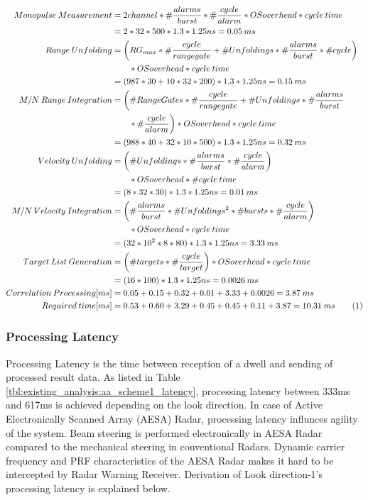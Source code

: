 \begin{align*}
	\label{aa:scheme1:core4:equ3}
		Monopulse \: Measurement &= 2channel * \#\frac{alarms}{burst} * \#\frac{cycle}{alarm} * OSoverhead * cycle \: time \\
		&= 2 * 32 * 500 * 1.3 * 1.25ns = 0.05 \: ms \\
		Range \: Unfolding &= \bigg(RG_{max} * \#\frac{cycle}{rangegate} + \# Unfoldings * \#\frac{alarms}{burst} * \#cycle\bigg) \\
		& \qquad *OSoverhead * cycle \: time \\
		&= (987 * 30 + 10 * 32 * 200) * 1.3 * 1.25ns = 0.15 \: ms \\
		M/N \: Range \: Integration &= \bigg(\#RangeGates * \#\frac{cycle}{rangegate} + \#Unfoldings * \#\frac{alarms}{burst} \\
		&\qquad * \#\frac{cycle}{alarm}\bigg) * OSoverhead *cycle \: time \\
		&= (988 * 40 + 32 * 10 * 500) * 1.3 * 1.25ns = 0.32 \: ms \\
		Velocity \: Unfolding &= \bigg(\#Unfoldings * \#\frac{alarms}{burst} * \#\frac{cycle}{alarm}\bigg) \\
		& \qquad * OSoverhead * \#cycle \: time \\
		&= (8 * 32 * 30) * 1.3 * 1.25ns = 0.01 \: ms \\
		M/N \: Velocity \: Integration &= \bigg(\#\frac{alarms}{burst} * \#Unfoldings^{2} * \#bursts * \#\frac{cycle}{alarm}\bigg) \\
		& \qquad * OSoverhead * cycle \: time \\
		&= (32 * 10^{2} * 8 * 80) * 1.3 * 1.25ns =  3.33 \: ms \\
		Target \: List \: Generation &= \bigg(\#targets * \#\frac{cycle}{target}\bigg) * OSoverhead * cycle \: time \\
		&= (16 * 100) * 1.3 * 1.25ns = 0.0026 \: ms \\
		Correlation \: Processing[ms] &= 0.05 + 0.15 + 0.32 + 0.01 + 3.33 + 0.0026 = 3.87 \: ms \\
		Required \: time[ms] &= 0.53 + 0.60 + 3.29 + 0.45 + 0.45 + 0.11 + 3.87 = 10.31 \: ms \stepcounter{equation}\tag{\theequation}
\end{align*}


\subsubsection{Processing Latency}
\label{sss:scheme1:latency}
Processing Latency is the time between reception of a dwell and sending of processed result data. As listed in Table \ref{tbl:existing_analysis:aa_scheme1_latency}, processing latency between 333ms and 617ms is achieved depending on the look direction. In case of Active Electronically Scanned Array (AESA) Radar, processing latency influnces agility of the system. Beam steering is performed electronically in AESA Radar compared to the mechanical steering in conventional Radars. Dynamic carrier frequency and PRF characteristics of the AESA Radar makes it hard to be intercepted by Radar Warning Receiver. Derivation of Look direction-1's processing latency is explained below. 

